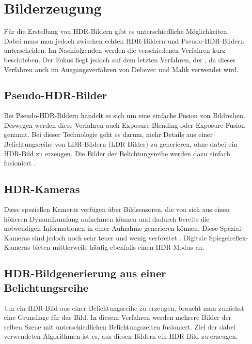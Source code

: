\section{Bilderzeugung}
Für die Erstellung von \gls{HDR}-Bildern gibt es unterschiedliche Möglichkeiten. Dabei muss man jedoch zwischen echten \gls{HDR}-Bildern und Pseudo-\gls{HDR}-Bildern unterscheiden. Im Nachfolgenden werden die verschiedenen Verfahren kurz beschrieben. Der Fokus liegt jedoch auf dem letzten Verfahren, der , da dieses Verfahren auch im Ausgangsverfahren von Debevec und Malik verwendet wird.


\subsection{Pseudo-\gls{HDR}-Bilder}
Bei Pseudo-\gls{HDR}-Bildern handelt es sich um eine einfache Fusion von Bildreihen. Deswegen werden diese Verfahren auch Exposure Blending oder Exposure Fusion genannt. Bei dieser Technologie geht es darum, mehr Details aus einer Belichtungsreihe von \acrshort{LDR}-Bildern (\acrlong{LDR} Bilder) zu generieren, ohne dabei ein \gls{HDR}-Bild zu erzeugen. Die Bilder der Belichtungsreihe werden dazu einfach fusioniert \cite{Jing_Hong_Zheng_Rahardja_2012}.

\subsection{HDR-Kameras} 
Diese speziellen Kameras verfügen über Bildsensoren, die von sich aus einen höheren Dynamikumfang aufnehmen können und dadurch bereits die notwendigen Informationen in einer Aufnahme generieren können. Diese Spezial-Kameras sind jedoch noch sehr teuer und wenig verbreitet \cite[S. 95ff]{Bloch2012}. Digitale Spiegelreflex-Kameras bieten mittlerweile häufig ebenfalls einen \gls{HDR}-Modus an.

\subsection{HDR-Bildgenerierung aus einer Belichtungsreihe}
\label{sub:belichtungsreihe}
Um ein \gls{HDR}-Bild aus einer Belichtungsreihe zu erzeugen, braucht man zunächst eine Grundlage für das Bild. In diesem Verfahren werden mehrere Bilder der selben Szene mit unterschiedlichen Belichtungszeiten fusioniert. Ziel der dabei verwendeten Algorithmen ist es, aus diesen Bildern ein \gls{HDR}-Bild zu erzeugen.

